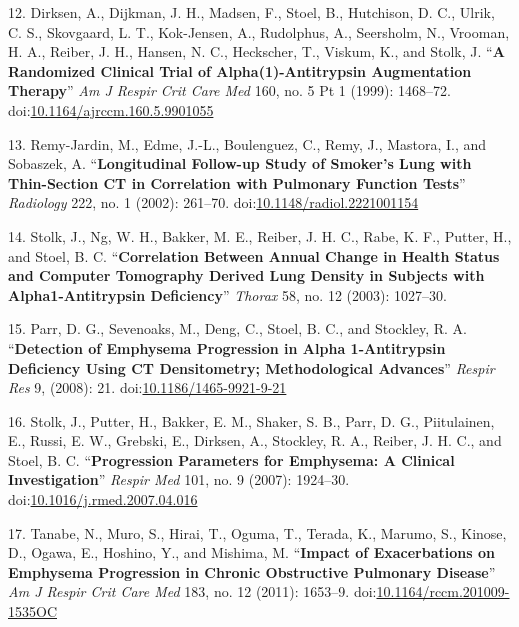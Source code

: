 \documentclass[11pt,]{article}
\begin{document}
\hypertarget{ref-Dirksen:1999aa}{}
12. Dirksen, A., Dijkman, J. H., Madsen, F., Stoel, B., Hutchison, D.
C., Ulrik, C. S., Skovgaard, L. T., Kok-Jensen, A., Rudolphus, A.,
Seersholm, N., Vrooman, H. A., Reiber, J. H., Hansen, N. C., Heckscher,
T., Viskum, K., and Stolk, J. ``\textbf{A Randomized Clinical Trial of
Alpha(1)-Antitrypsin Augmentation Therapy}'' \emph{Am J Respir Crit Care
Med} 160, no. 5 Pt 1 (1999): 1468--72.
doi:\href{https://doi.org/10.1164/ajrccm.160.5.9901055}{10.1164/ajrccm.160.5.9901055}

\hypertarget{ref-Remy-Jardin:2002aa}{}
13. Remy-Jardin, M., Edme, J.-L., Boulenguez, C., Remy, J., Mastora, I.,
and Sobaszek, A. ``\textbf{Longitudinal Follow-up Study of Smoker's Lung
with Thin-Section CT in Correlation with Pulmonary Function Tests}''
\emph{Radiology} 222, no. 1 (2002): 261--70.
doi:\href{https://doi.org/10.1148/radiol.2221001154}{10.1148/radiol.2221001154}

\hypertarget{ref-Stolk:2003aa}{}
14. Stolk, J., Ng, W. H., Bakker, M. E., Reiber, J. H. C., Rabe, K. F.,
Putter, H., and Stoel, B. C. ``\textbf{Correlation Between Annual Change
in Health Status and Computer Tomography Derived Lung Density in
Subjects with Alpha1-Antitrypsin Deficiency}'' \emph{Thorax} 58, no. 12
(2003): 1027--30.

\hypertarget{ref-Parr:2008aa}{}
15. Parr, D. G., Sevenoaks, M., Deng, C., Stoel, B. C., and Stockley, R.
A. ``\textbf{Detection of Emphysema Progression in Alpha 1-Antitrypsin
Deficiency Using CT Densitometry; Methodological Advances}''
\emph{Respir Res} 9, (2008): 21.
doi:\href{https://doi.org/10.1186/1465-9921-9-21}{10.1186/1465-9921-9-21}

\hypertarget{ref-Stolk:2007aa}{}
16. Stolk, J., Putter, H., Bakker, E. M., Shaker, S. B., Parr, D. G.,
Piitulainen, E., Russi, E. W., Grebski, E., Dirksen, A., Stockley, R.
A., Reiber, J. H. C., and Stoel, B. C. ``\textbf{Progression Parameters
for Emphysema: A Clinical Investigation}'' \emph{Respir Med} 101, no. 9
(2007): 1924--30.
doi:\href{https://doi.org/10.1016/j.rmed.2007.04.016}{10.1016/j.rmed.2007.04.016}

\hypertarget{ref-Tanabe:2011aa}{}
17. Tanabe, N., Muro, S., Hirai, T., Oguma, T., Terada, K., Marumo, S.,
Kinose, D., Ogawa, E., Hoshino, Y., and Mishima, M. ``\textbf{Impact of
Exacerbations on Emphysema Progression in Chronic Obstructive Pulmonary
Disease}'' \emph{Am J Respir Crit Care Med} 183, no. 12 (2011): 1653--9.
doi:\href{https://doi.org/10.1164/rccm.201009-1535OC}{10.1164/rccm.201009-1535OC}
\end{document}
